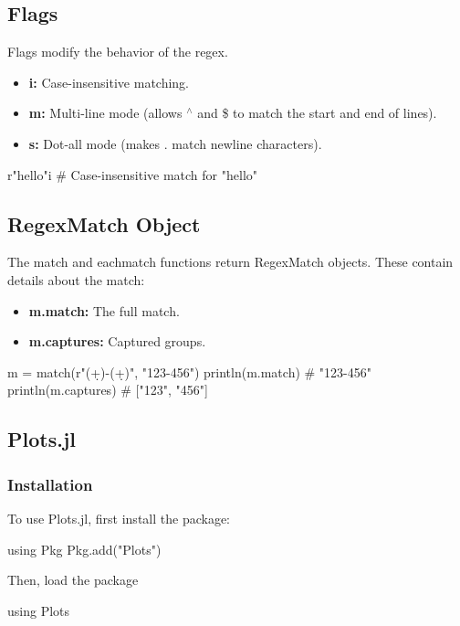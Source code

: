 \documentclass{report}
\begin{document}
     \bigbreak \noindent 
     \subsection{Flags}
     \bigbreak \noindent 
     Flags modify the behavior of the regex. 
     \begin{itemize}
         \item \textbf{i:} Case-insensitive matching.
         \item \textbf{m:} Multi-line mode (allows $^{\land} $ and \$ to match the start and end of lines).
         \item \textbf{s:} Dot-all mode (makes . match newline characters).
     \end{itemize}
     \bigbreak \noindent 
     \begin{jlcode}
     r"hello"i  # Case-insensitive match for "hello"
     \end{jlcode}

     \bigbreak \noindent 
     \subsection{RegexMatch Object}
     \bigbreak \noindent 
     The match and eachmatch functions return RegexMatch objects. These contain details about the match:
     \begin{itemize}
         \item \textbf{m.match:} The full match.
         \item \textbf{m.captures:} Captured groups.
     \end{itemize}
     \bigbreak \noindent 
     \begin{jlcode}
         m = match(r"(\d+)-(\d+)", "123-456")
         println(m.match)    # "123-456"
         println(m.captures) # ["123", "456"]
     \end{jlcode}

     \pagebreak 
     \bigbreak \noindent 
     \subsection{Plots.jl}
     \bigbreak \noindent 
     \subsubsection{Installation}
     \bigbreak \noindent 
     To use Plots.jl, first install the package:
     \bigbreak \noindent 
     \begin{jlcode}
     using Pkg
     Pkg.add("Plots")
     \end{jlcode}
     \bigbreak \noindent 
     Then, load the package
     \bigbreak \noindent 
     \begin{jlcode}
     using Plots
     \end{jlcode}
     \bigbreak \noindent 
\end{document}
